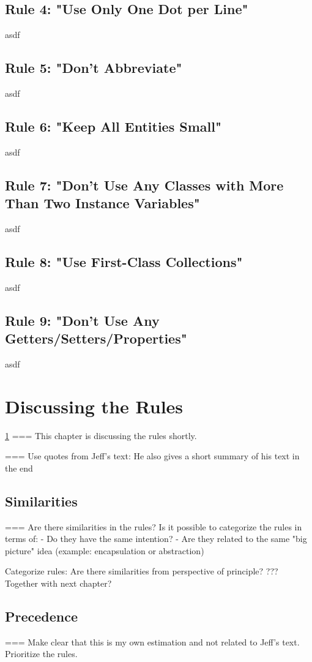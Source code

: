 \subsection{Rule 4: "Use Only One Dot per Line"}
asdf
\subsection{Rule 5: "Don't Abbreviate"}
asdf
\subsection{Rule 6: "Keep All Entities Small"}
asdf
\subsection{Rule 7: "Don’t Use Any Classes with More Than Two Instance Variables"}
asdf
\subsection{Rule 8: "Use First-Class Collections"}
asdf
\subsection{Rule 9: "Don’t Use Any Getters/Setters/Properties"}
asdf
\section{Discussing the Rules}
\label{d:discussion}
\ref{d:discussion}
=== This chapter is discussing the rules shortly. 

=== Use quotes from Jeff's text: He also gives a short summary of his text in the end

\subsection{Similarities}
=== Are there similarities in the rules? Is it possible to categorize the rules in terms of: 
 - Do they have the same intention?
 - Are they related to the same "big picture" idea (example: encapsulation or abstraction) 

Categorize rules: Are there similarities from perspective of principle? ??? Together with next chapter?

\subsection{Precedence}
=== Make clear that this is my own estimation and not related to Jeff's text. Prioritize the rules. 

